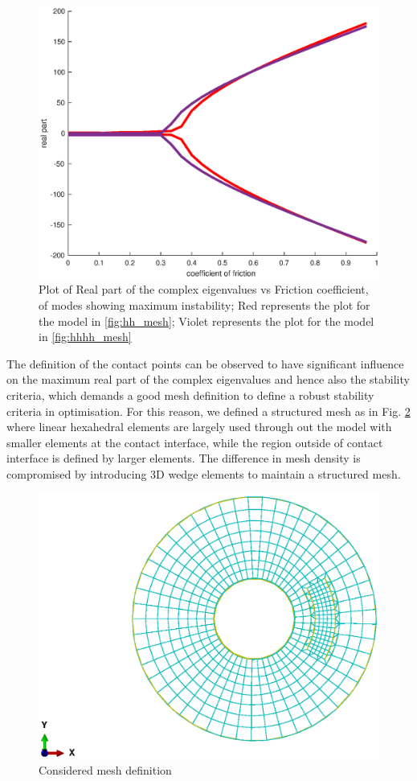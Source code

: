 \begin{figure}
    \centering
    \includegraphics[scale=0.43]{Chapter2/Pictures/hhvshhhh_real.eps}
    \caption{Plot of Real part of the complex eigenvalues vs Friction coefficient, of modes showing maximum instability; Red represents the plot for the model in \ref{fig:hh_mesh}; Violet represents the plot for the model in \ref{fig:hhhh_mesh}}
    \label{fig:hhhh_real}
\end{figure}

The definition of the contact points can be observed to have significant influence on the maximum real part of the complex eigenvalues and hence also the stability criteria, which demands a good mesh definition to define a robust stability criteria in optimisation. For this reason, we defined a structured mesh as in Fig. \ref{fig:disc_mesh} where linear hexahedral elements are largely used through out the model with smaller elements at the contact interface, while the region outside of contact interface is defined by larger elements. The difference in mesh density is compromised by introducing 3D wedge elements to maintain a structured mesh.\\ 


\begin{figure}
    \centering
    \includegraphics[scale=0.6]{Chapter2/Pictures/disc1.eps}
    \caption{Considered mesh definition}
    \label{fig:disc_mesh}
\end{figure}





